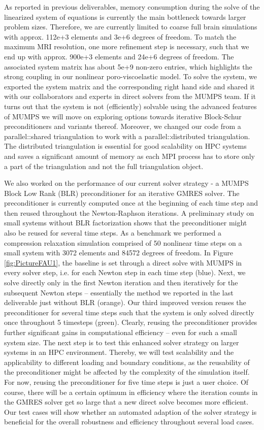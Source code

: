 \documentclass[a4paper,12pt]{article}
\begin{document}
As reported in previous deliverables, memory consumption during the solve of the linearized system of equations is currently the main bottleneck towards larger problem sizes. Therefore, we are currently limited to coarse full brain simulations with approx. 112e+3 elements and 3e+6 degrees of freedom. To match the maximum MRI resolution, one more refinement step is necessary, such that we end up with approx. 900e+3 elements and 24e+6 degrees of freedom. The associated system matrix has about 5e+9 non-zero entries, which highlights the strong coupling in our nonlinear poro-viscoelastic model. To solve the system, we exported the system matrix and the corresponding right hand side and shared it with our collaborators and experts in direct solvers from the MUMPS team. If it turns out that the system is not (efficiently) solvable using the advanced features of MUMPS we will move on exploring options towards iterative Block-Schur preconditioners and variants thereof. Moreover, we changed our code from a parallel::shared triangulation to work with a parallel::distributed triangulation. The distributed triangulation is essential for good scalability on HPC systems and saves a significant amount of memory as each MPI process has to store only a part of the triangulation and not the full triangulation object. 

We also worked on the performance of our current solver strategy - a MUMPS Block Low Rank (BLR) preconditioner for an iterative GMRES solver. The preconditioner is currently computed once at the beginning of each time step and then reused throughout the Newton-Raphson iterations. A preliminary study on small systems without BLR factorization shows that the preconditioner might also be reused for several time steps. As a benchmark we performed a compression relaxation simulation comprised of 50 nonlinear time steps on a small system with 3072 elements and 84572 degrees of freedom. In Figure \ref{fig:PictureFAU1}, the baseline is set through a direct solve with MUMPS in every solver step, i.e. for each Newton step in each time step (blue). Next, we solve directly only in the first Newton iteration and then iteratively for the subsequent Newton steps – essentially the method we reported in the last deliverable just without BLR (orange). Our third improved version reuses the preconditioner for several time steps such that the system is only solved directly once throughout 5 timesteps (green). Clearly, reusing the preconditioner provides further significant gains in computational efficiency – even for such a small system size. The next step is to test this enhanced solver strategy on larger systems in an HPC environment. Thereby, we will test scalability and the applicability to different loading and boundary conditions, as the reusability of the preconditioner might be affected by the complexity of the simulation itself. For now, reusing the preconditioner for five time steps is just a user choice. Of course, there will be a certain optimum in efficiency where the iteration counts in the GMRES solver get so large that a new direct solve becomes more efficient.  Our test cases will show whether an automated adaption of the solver strategy is beneficial for the overall robustness and efficiency throughout several load cases. 
\end{document}
